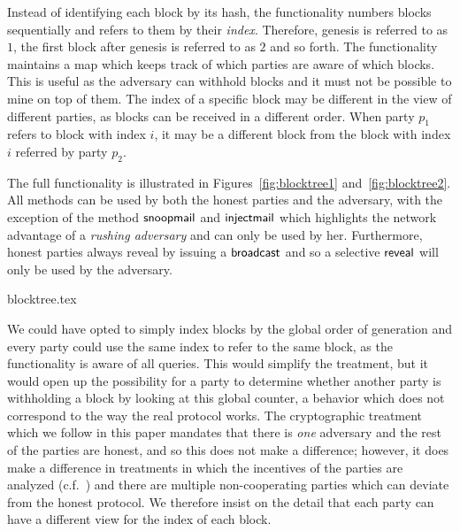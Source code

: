 Instead of identifying each block by its hash, the functionality numbers blocks
sequentially and refers to them by their \emph{index}. Therefore, genesis is
referred to as $1$, the first block after genesis is referred to as $2$ and so
forth. The functionality maintains a map which keeps track of which parties are
aware of which blocks. This is useful as the adversary can withhold blocks and
it must not be possible to mine on top of them. The index of a specific block
may be different in the view of different parties, as blocks can be received in
a different order. When party $p_1$ refers to block with index $i$, it may be a
different block from the block with index $i$ referred by party $p_2$.

The full functionality is illustrated in Figures~\ref{fig:blocktree1}
and~\ref{fig:blocktree2}. All methods can be used by both the honest parties and
the adversary, with the exception of the method $\textsf{snoopmail}$ and $\textsf{injectmail}$
which highlights the network advantage of a \emph{rushing adversary} and can
only be used by her. Furthermore, honest parties always reveal by issuing a
$\textsf{broadcast}$ and so a selective $\textsf{reveal}$ will only be used by the adversary.

{blocktree.tex}

\begin{remark}
We could have opted to simply index blocks by the global order of generation and
every party could use the same index to refer to the same block, as the
functionality is aware of all queries. This would simplify the treatment, but it
would open up the possibility for a party to determine whether another party is
withholding a block by looking at this global counter, a behavior which does not
correspond to the way the real protocol works. The cryptographic treatment which
we follow in this paper mandates that there is \emph{one} adversary and the rest
of the parties are honest, and so this does not make a difference; however, it
does make a difference in treatments in which the incentives of the parties are
analyzed (c.f.~\cite{C:KRDO17}) and there are multiple non-cooperating parties
which can deviate from the honest protocol. We therefore insist on the detail
that each party can have a different view for the index of each block.
\end{remark}

